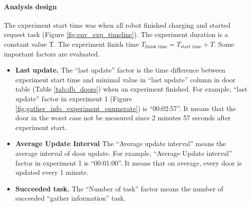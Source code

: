 
\paragraph{Analysis design} The experiment start time was when all robot finished charging and started request task (Figure \ref{fig:env_exp_timeline}). The experiment duration is a constant value T. The experiment finish time $T_{\mbox{finish time}} = T_{\mbox{start time}} + T $. Some important factors are evaluated. 
\begin{itemize}
 \item \textbf{Last update.} The ``last update'' factor is the time difference between experiment start time and minimal value in ``last update'' column in door table (Table \ref{tab:db_doors}) when an experiment finished. For example, ``last update'' factor in experiment 1 (Figure \ref{fig:gather_info_experiment_enumerate}) is ``00:02:57''. It means that the door in the worst case not be measured since 2 minutes 57 seconds after experiment start.
 \item \textbf{Average Update Interval} The ``Average update interval'' means the average interval of door update. For example, ``Average Update interval'' factor in experiment 1 is ``00:01:00''. It means that on average, every door is updated every 1 minute.
 \item \textbf{Succeeded task.} The ``Number of task'' factor means the number of succeeded ``gather information'' task.
\end{itemize}

